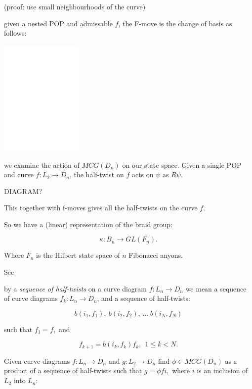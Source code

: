 \documentclass[12pt,a4paper]{article}
\begin{document}
(proof: use small neighbourhoods of the curve)

 given a nested POP and admissable $f$,
the F-move is the change of basis as follows:

\begin{center}
\includegraphics[width=0.3\textwidth]{POP-4.eps}
\end{center}

 we examine the action of $MCG(D_n)$
on our state space. Given a single POP and curve $f:L_2\to D_n$,
the half-twist on $f$ acts on $\psi$ as $R\psi$.

DIAGRAM?

This together with f-moves gives all the half-twists on
the curve $f$.

So we have a (linear) representation of the braid group:

    $$ \kappa : B_n \to GL(F_n).$$

Where $F_n$ is the Hilbert state space of $n$ Fibonacci anyons.

See \cite{Pfeifer12, Pfeifer14}




 by a {\it sequence of half-twists} on a curve
diagram $f:L_n\to D_n$ we mean a
sequence of curve diagrams $f_k: L_n\to D_n$, and a sequence of half-twists:

        $$ b(i_1, f_1),\ b(i_2, f_2),\ ...\ b(i_N, f_N) $$

such that $f_1=f,$ and

        $$ f_{k+1} = b(i_k, f_k) f_k,\ \  \text{} 1\leq k<N.$$


Given curve diagrams $f:L_n\to D_n$ and $g:L_2\to D_n$
find $\phi\in MCG(D_n)$ as a product of
a sequence of half-twists such that
$g = \phi f i,$ where $i$ is an inclusion of $L_2$ into $L_n:$
\end{document}
